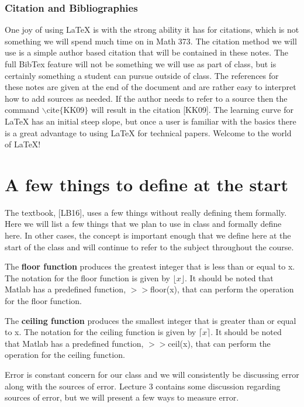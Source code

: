 \documentclass[twoside]{article}
\renewcommand{\cite}[1]{[#1]}
\begin{document}
\subsubsection{Citation and Bibliographies}
One joy of using LaTeX is with the strong ability it has for citations, which is not something we will spend much time on in Math 373. The citation method we will use is a simple author based citation that will be contained in these notes. The full BibTex feature will not be something we will use as part of class, but is certainly something a student can pursue outside of class. The references for these notes are given at the end of the document and are rather easy to interpret how to add sources as needed. If the author needs to refer to a source then the command $\backslash$cite$\{$KK09$\}$ will result in the citation \cite{KK09}. The learning curve for LaTeX has an initial steep slope, but once a user is familiar with the basics there is a great advantage to using LaTeX for technical papers. Welcome to the world of \LaTeX! 

\section{A few things to define at the start} \label{s:error_section}
The textbook, \cite{LB16}, uses a few things without really defining them formally. Here we will list a few things that we plan to use in class and formally define here. In other cases, the concept is important enough that we define here at the start of the class and will continue to refer to the subject throughout the course. 

 The {\bf floor function} produces the greatest integer that is less than or equal to x. The notation for the floor function is given by $\lfloor x \rfloor$. It should be noted that Matlab has a predefined function, $>>$floor(x), that can perform the operation for the floor function. 

 The {\bf ceiling function} produces the smallest integer that is greater than or equal to x. The notation for the ceiling function is given by $\lceil x \rceil$. It should be noted that Matlab has a predefined function, $>>$ceil(x), that can perform the operation for the ceiling function. 

Error is constant concern for our class and we will consistently be discussing error along with the sources of error. Lecture 3 contains some discussion regarding sources of error, but we will present a few ways to measure error.  
\end{document}
